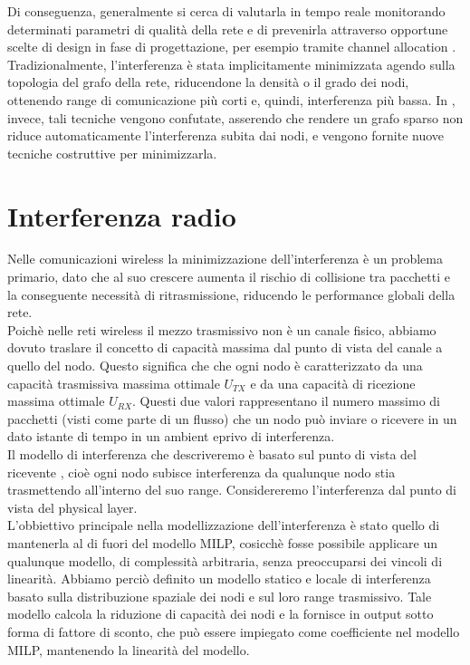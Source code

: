 Di  conseguenza, generalmente si cerca di valutarla in tempo reale monitorando determinati parametri di qualità della rete \cite{Halperin:2010:PPD:1851275.1851203,6151307} e di prevenirla attraverso opportune scelte di design in fase di progettazione, per esempio tramite channel allocation \cite{7383864}. \\
Tradizionalmente, l'interferenza è stata implicitamente minimizzata agendo sulla topologia del grafo della rete, riducendone la densità o il grado dei nodi, ottenendo range di comunicazione più corti e, quindi, interferenza più bassa. In \cite{burkhart2004does}, invece, tali tecniche vengono confutate, asserendo che rendere un grafo sparso non riduce automaticamente l'interferenza subita dai nodi, e vengono fornite nuove tecniche costruttive per minimizzarla. \\


\section{Interferenza radio}
Nelle comunicazioni wireless la minimizzazione dell'interferenza è un problema primario, dato che al suo crescere aumenta il rischio di collisione tra pacchetti e la conseguente necessità di ritrasmissione, riducendo le performance globali della rete. \\
Poichè nelle reti wireless il mezzo trasmissivo non è un canale fisico, abbiamo dovuto traslare il concetto di capacità massima dal punto di vista del canale a quello del nodo. Questo significa che che ogni nodo è caratterizzato da una capacità trasmissiva massima ottimale $U_{TX}$ e da una capacità di ricezione massima ottimale $U_{RX}$. Questi due valori rappresentano il numero massimo di pacchetti (visti come parte di un flusso) che un nodo può inviare o ricevere in un dato istante di tempo in un ambient eprivo di interferenza. \\
Il modello di interferenza che descriveremo è basato sul punto di vista del ricevente \cite{Rickenbach05arobust}, cioè ogni nodo subisce interferenza da qualunque nodo stia trasmettendo all'interno del suo range. Considereremo l'interferenza dal punto di vista del physical layer. \\
L'obbiettivo principale nella modellizzazione dell'interferenza è stato quello di mantenerla al di fuori del modello MILP, cosicchè fosse possibile applicare un qualunque modello, di complessità arbitraria, senza preoccuparsi dei vincoli di linearità.
Abbiamo perciò definito un modello statico e locale di interferenza basato sulla distribuzione spaziale dei nodi e sul loro range trasmissivo. Tale modello calcola la riduzione di capacità dei nodi e la fornisce in output sotto forma di fattore di sconto, che può essere impiegato come coefficiente nel modello MILP, mantenendo la linearità del modello.

